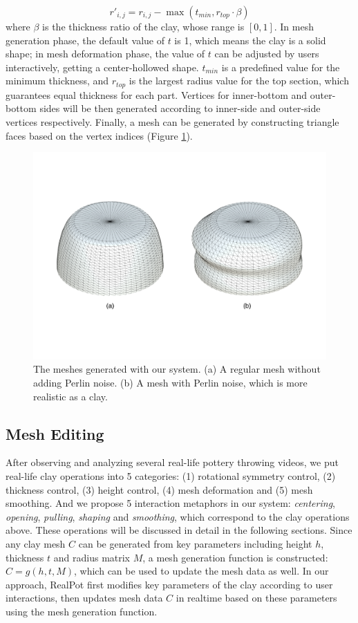 \documentclass{svjour3}                     %
\begin{document}
\begin{equation}
r'_{i,j} = r_{i,j} - \max(t_{min}, r_{top} \cdot \beta)
\end{equation}
where $\beta$ is the thickness ratio of the clay, whose range is $[0,1]$. In mesh generation phase, the default value of $t$ is 1, which means the clay is a solid shape; in mesh deformation phase, the value of $t$ can be adjusted by users interactively, getting a center-hollowed shape. $t_{min}$ is a predefined value for the minimum thickness, and $r_{top}$ is the largest radius value for the top section, which guarantees equal thickness for each part.
Vertices for inner-bottom and outer-bottom sides will be then generated according to inner-side and outer-side vertices respectively. Finally, a mesh can be generated by constructing triangle faces based on the vertex indices (Figure \ref{fig:mesh}).

\begin{figure}
\includegraphics[width=\textwidth]{fig6}
\caption{The meshes generated with our system. (a) A regular mesh without adding Perlin noise. (b) A mesh with Perlin noise, which is more realistic as a clay.}
\label{fig:mesh}
\end{figure}

\subsection{Mesh Editing}
\label{sec:4.2}
After observing and analyzing several real-life pottery throwing videos, we put real-life clay operations into 5 categories: (1) rotational symmetry control, (2) thickness control, (3) height control, (4) mesh deformation and (5) mesh smoothing.
And we propose 5 interaction metaphors in our system: \textit{centering}, \textit{opening}, \textit{pulling}, \textit{shaping} and \textit{smoothing}, which correspond to the clay operations above.
These operations will be discussed in detail in the following sections.
Since any clay mesh $C$ can be generated from key parameters including height $h$, thickness $t$ and radius matrix $M$, a mesh generation function is constructed: $C =  g(h, t, M)$, which can be used to update the mesh data as well.
In our approach, RealPot first modifies key parameters of the clay according to user interactions, then updates mesh data $C$ in realtime based on these parameters using the mesh generation function.
\end{document}
